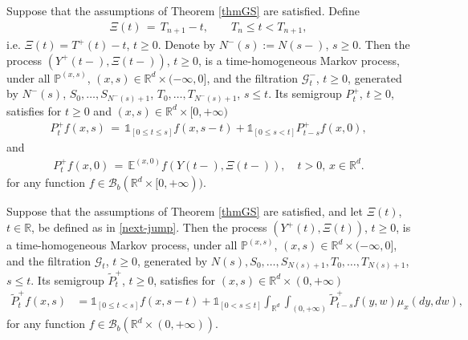 \documentclass[10pt,a4paper]{amsart}
\newcommand{\PP}{\mathds{P}}
\newcommand{\RR}{\mathbb{R}}
\newcommand{\wt}{\widetilde}
\begin{document}
	\begin{theorem}
		\label{thmGS+}
		Suppose that the assumptions of Theorem \ref{thmGS} are satisfied. Define
		\begin{align}\label{next-jump}
			\Xi(t) \, = \, T_{n+1}-t, \qquad T_n \le  t < T_{n+1},
		\end{align}
		i.e. $\Xi (t) = T^+(t)-t$, $t \geq 0$. Denote by $N^-(s):= N(s-)$, $s \geq 0$.
		Then the process $(Y^+(t-), \Xi(t-))$, $t \geq 0$, is a time-homogeneous Markov process, under all $\PP^{(x,s)}$, $(x,s)\in \RR^d\times (-\infty,0]$, and the filtration $\mathcal{G}^-_t$, $t \geq 0$, generated by $N^-(s)$, $S_0, \dots, S_{N^-(s)+1}$, $T_0, \dots, T_{N^-(s)+1}$, $s \leq t$. Its semigroup $P_t^+$, $t \geq 0$, satisfies for $t\ge 0$ and $(x,s)\in\RR^d\times [0,+\infty)$
		\begin{align}\label{710-a1}
			P_t^+f(x,s) \, = \, \mathds{1}_{[0 \leq t \le  s]} f(x,s-t)+ \mathds{1}_{[0 \leq s <t]} P_{t-s}^+f(x,0),
		\end{align}
		and
		\begin{align}\label{710-b1}
			P_t^+f(x,0) \, = \, \mathds{E}^{(x,0)}f(Y(t-), \Xi(t-)),\quad t>0,\, x\in \RR^d.
		\end{align}
		for any function $f \in \mathcal{B}_b (\mathbb{R}^d \times [0, +\infty))$.
	\end{theorem}

	\begin{theorem}
		\label{thmGS+1}
		Suppose that the assumptions of Theorem \ref{thmGS} are satisfied, and let $\Xi(t)$, $t\in \RR$, be defined as in \eqref{next-jump}. Then the process $(Y^+(t), \Xi(t))$, $t \geq 0$, is a time-homogeneous Markov process, under all $\PP^{(x,s)}$, $(x,s)\in \RR^d\times (-\infty,0]$, and the filtration $\mathcal{G}_t$, $t \geq0$, generated by $N(s), S_0, \dots, {S_{N(s)+1}}, T_0, \dots, {T_{N(s)+1}}$, $s \leq t$. Its semigroup $\wt P_t^+$, $t \geq 0$, satisfies for $(x,s)\in \RR^d\times (0,+\infty)$
		\begin{align}\label{710-a}
			\wt P^+_tf(x,s)&=\mathds{1}_{[0\le t<s]}f(x,s-t)+\mathds{1}_{[0<s\le t ]}\int_{\RR^d}\int_{(0,+\infty)}\wt P^+_{t-s}f(y,w)\mu_{x}(dy,dw),
		\end{align}
		for any function $f \in \mathcal{B}_b (\mathbb{R}^d \times (0, +\infty))$.
	\end{theorem}
\end{document}

